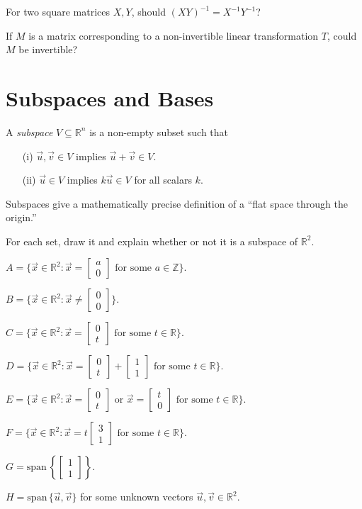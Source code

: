 \documentclass[14pt]{problemset}
\newcommand{\R}{\mathbb{R}}
\newcommand{\Z}{\mathbb{Z}}
\renewcommand{\span}{\mathrm{span}\,}
\newcommand{\mat}[1]{\begin{bmatrix}#1\end{bmatrix}}
\begin{document}
	\question
	\begin{parts}
		\item For two square matrices $X,Y$, should $(XY)^{-1}=X^{-1}Y^{-1}$?
		\item If $M$ is a matrix corresponding to a non-invertible linear transformation $T$,
			could $M$ be invertible?
	\end{parts}



\section*{Subspaces and Bases}
	\vspace{-1em}
	\begin{definition}[Subspace]
		A \emph{subspace} $V\subseteq \R^n$ is a non-empty subset such that
		\begin{enumerate}
			\item[(i)] $\vec u,\vec v\in V$ implies $\vec u+\vec v\in V$.
			\item[(ii)] $\vec u\in V$ implies $k\vec u\in V$ for all scalars $k$.
		\end{enumerate}
	\end{definition}

	Subspaces give a mathematically precise definition of a ``flat space through the origin.''

	\question
	For each set, draw it and explain whether or not it is a subspace of $\R^2$.
	\begin{parts}
		\item $A=\{\vec x\in\R^2:\vec x=\mat{a\\0}\text{ for some }a\in\Z\}$.
		\item $B=\{\vec x\in\R^2:\vec x\neq \mat{0\\0}\}$.
		\item $C=\{\vec x\in\R^2:\vec x=\mat{0\\t}\text{ for some }t\in\R\}$.
		\item $D=\{\vec x\in\R^2:\vec x=\mat{0\\t}+\mat{1\\1}\text{ for some }t\in\R\}$.
		\item $E=\{\vec x\in\R^2:\vec x=\mat{0\\t}\text{ or }\vec x=\mat{t\\0}\text{ for some }t\in\R\}$.
		\item $F=\{\vec x\in\R^2:\vec x=t\mat{3\\1}\text{ for some }t\in\R\}$.
		\item $G=\span\left\{\mat{1\\1}\right\}$.
		\item $H=\span\{\vec u,\vec v\}$ for some unknown vectors $\vec u,\vec v\in\R^2$.
	\end{parts}
	
\end{document}
